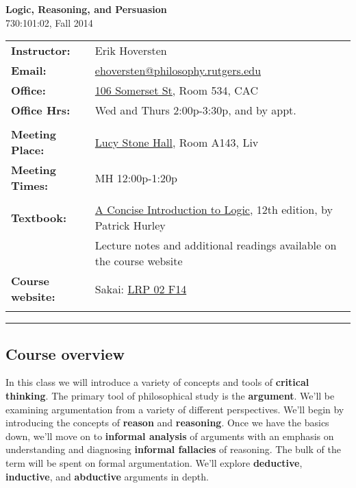 \documentclass{article}
\begin{document}
 
\begin{center}
 \textbf{Logic, Reasoning, and Persuasion} \\ 730:101:02, Fall 2014
\end{center}

\begin{tabular}{ll}
 \textbf{Instructor:} & Erik Hoversten \\
 \textbf{Email:} & \href{mailto:ehoversten@philosophy.rutgers.edu}{ehoversten@philosophy.rutgers.edu} \\
 \textbf{Office:} & \href{http://rumaps.rutgers.edu/location/gateway-transit-village}{106 Somerset St}, Room 534, CAC \\
 \textbf{Office Hrs:} & Wed and Thurs 2:00p-3:30p, and by appt. \\
 & \\
 \textbf{Meeting Place:} & \href{http://rumaps.rutgers.edu/location/lucy-stone-hall}{Lucy Stone Hall}, Room A143, Liv  \\
 \textbf{Meeting Times:} &  MH 12:00p-1:20p \\
 & \\
 \textbf{Textbook:} & \href{http://www.cengage.com/search/productOverview.do?N=0&Ntk=P_Isbn13&Ntt=9781285196541#TableofContents}{A Concise Introduction to Logic}, 12th edition, by Patrick Hurley \\
 & Lecture notes and additional readings available on the course website \\
 \textbf{Course website:} & Sakai: \href{https://sakai.rutgers.edu/portal/site/3eb4edf6-27b0-417a-9057-80ba3626670d}{LRP 02 F14} \\
 & \\ 
\end{tabular}

\hrule

\subsection*{Course overview}
In this class we will introduce a variety of concepts and tools of \textbf{critical thinking}.  The primary tool of philosophical study is the \textbf{argument}.  We'll be examining argumentation from a variety of different perspectives.  We'll begin by introducing the concepts of \textbf{reason} and \textbf{reasoning}.  Once we have the basics down, we'll move on to \textbf{informal analysis} of arguments with an emphasis on understanding and diagnosing \textbf{informal fallacies} of reasoning.  The bulk of the term will be spent on formal argumentation.  We'll explore \textbf{deductive}, \textbf{inductive}, and \textbf{abductive} arguments in depth.
\end{document}
